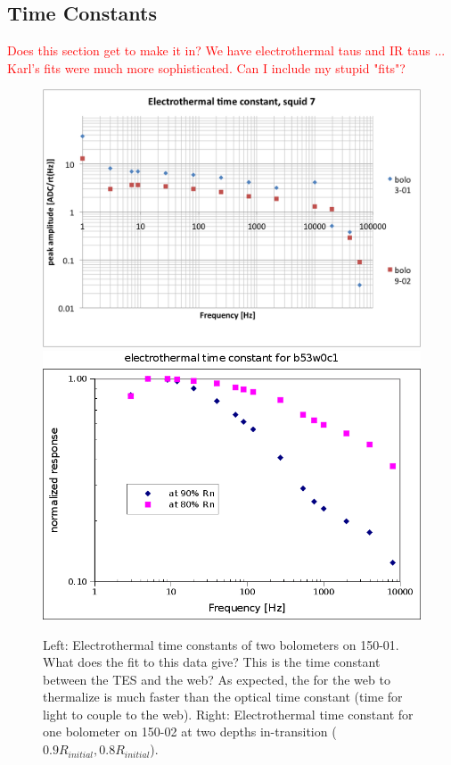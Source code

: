 
\subsection{Time Constants}
\label{sec:time_constants}

\textcolor{red}{Does this section get to make it in? We have electrothermal taus and IR taus ... Karl's fits were much more sophisticated. Can I include my stupid "fits"?}

\begin{figure}[ht!]
\begin{center}
\includegraphics[width=0.48\columnwidth]{figures/Nb01_squid7_etau_morepts.png}
\includegraphics[width=0.48\columnwidth]{figures/b53w0c1_etau.png}
\caption{Left: Electrothermal time constants of two bolometers on 150-01. What does the fit to this data give? This is the time constant between the TES and the web? As expected, the for the web to thermalize is much faster than the optical time constant (time for light to couple to the web). Right: Electrothermal time constant for one bolometer on 150-02 at two depths in-transition ($0.9R_{initial}, 0.8R_{initial}$). 
\label{fig:electrothermal_tau} }
\end{center}
\end{figure}

